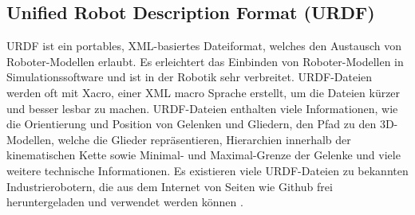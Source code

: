 \subsection{Unified Robot Description Format (URDF)}
URDF ist ein portables, XML-basiertes Dateiformat, welches den Austausch von Ro\-bo\-ter-\-Modellen erlaubt.
Es erleichtert das Einbinden von Roboter-Modellen in Simulationssoftware und ist in der Robotik sehr verbreitet.
URDF-Dateien werden oft mit Xacro, einer XML macro Sprache erstellt, um die Dateien kürzer und besser lesbar zu machen.
URDF-Dateien enthalten viele Informationen, wie die Orientierung und Position von Gelenken und Gliedern, den Pfad zu den 3D-Modellen,
welche die Glieder repräsentieren, Hierarchien innerhalb der kinematischen Kette sowie Minimal- und Maximal-Grenze der Gelenke und viele weitere
technische Informationen.
Es existieren viele URDF-Dateien zu bekannten Industrierobotern, die aus dem Internet von Seiten wie Github frei heruntergeladen und verwendet werden können
.

